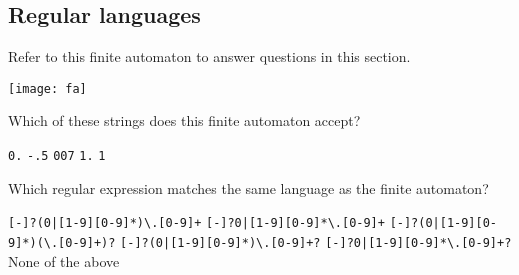 \documentclass[addpoints]{exam}
\begin{document}
\begin{questions}

\pagebreak
\section{Regular languages}
Refer to this finite automaton to answer questions in this section. 

\texttt{[image: fa]}

\question Which of these strings does this finite automaton accept?

\begin{oneparchoices}
\choice \verb$0.$
\choice \verb$-.5$
\choice \verb$007$
\choice \verb$1.$
\choice \verb$1$
\end{oneparchoices}

\answerline

\question Which regular expression matches the same language as the finite automaton?

\begin{choices}
\choice \verb$[-]?(0|[1-9][0-9]*)\.[0-9]+$
\choice \verb$[-]?0|[1-9][0-9]*\.[0-9]+$
\choice \verb$[-]?(0|[1-9][0-9]*)(\.[0-9]+)?$
\choice \verb$[-]?(0|[1-9][0-9]*)\.[0-9]+?$
\choice \verb$[-]?0|[1-9][0-9]*\.[0-9]+?$
\choice None of the above
\end{choices}


\end{questions}
\end{document}
